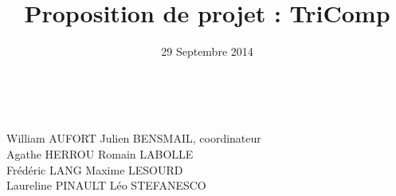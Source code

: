 \documentclass{article}
\title{Proposition de projet : TriComp}
\author{}
\date{29 Septembre 2014}
\begin{document}
\makeatletter %
  \begin{titlepage}
    \begin{center}
       {\LARGE \@title} \\
       \vspace{1cm}
       {\large \@date}
       \vspace{2cm}       
    \end{center}
       {\large
       William AUFORT \hfill Julien BENSMAIL, coordinateur\\
       Agathe HERROU  \hfill Romain LABOLLE \\
       Frédéric LANG \hfill Maxime LESOURD \\
       Laureline PINAULT \hfill Léo STEFANESCO \\}
  \tableofcontents          
  \end{titlepage}
\makeatother

\pagebreak

%

%
\end{document}
